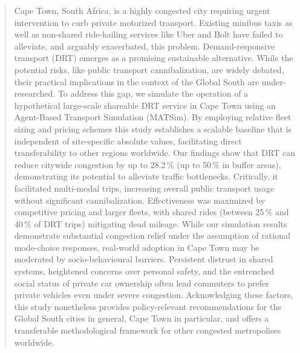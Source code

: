 \documentclass[preprint,12pt,authoryear]{elsarticle}
\begin{document}
\begin{frontmatter}





\newpage
\begin{abstract}



Cape Town, South Africa, is a highly congested city requiring urgent intervention to curb private motorized transport. Existing minibus taxis as well as non-shared ride-hailing services like Uber and Bolt have failed to alleviate, and arguably exacerbated, this problem. Demand-responsive transport (DRT) emerges as a promising sustainable alternative. While the potential risks, like public transport cannibalization, are widely debated, their practical implications in the context of the Global South are under-researched. To address this gap, we simulate the operation of a hypothetical large-scale shareable DRT service in Cape Town using an Agent-Based Transport Simulation (MATSim). By employing relative fleet sizing and pricing schemes this study establishes a scalable baseline that is independent of site-specific absolute values, facilitating direct transferability to other regions worldwide. Our findings show that DRT can reduce citywide congestion by up to 28.2\,\% (up to 50\,\% in buffer areas), demonstrating its potential to alleviate traffic bottlenecks. Critically, it facilitated multi-modal trips, increasing overall public transport usage without significant cannibalization. Effectiveness was maximized by competitive pricing and larger fleets, with shared rides (between 25\,\% and 40\,\% of DRT trips) mitigating dead mileage. While our simulation results demonstrate substantial congestion relief under the assumption of rational mode-choice responses, real-world adoption in Cape Town may be moderated by socio-behavioural barriers. Persistent distrust in shared systems, heightened concerns over personal safety, and the entrenched social status of private car ownership often lead commuters to prefer private vehicles even under severe congestion. Acknowledging these factors, this study nonetheless provides policy-relevant recommendations for the Global South cities in general, Cape Town in particular, and offers a transferable methodological framework for other congested metropolises worldwide.


\end{abstract}
\end{frontmatter}
\end{document}
